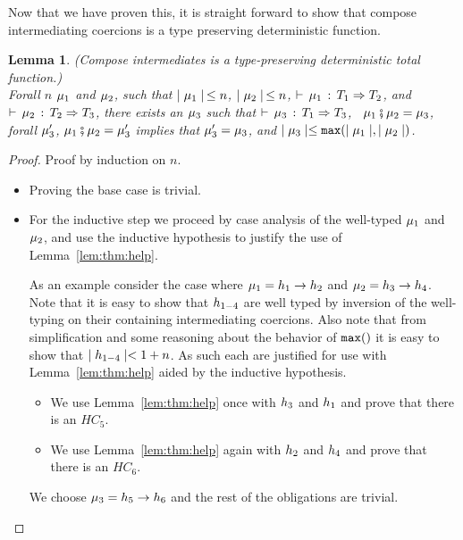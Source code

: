 \documentclass[acmtog, authorversion, acmlarge]{acmart}
\newtheorem{lem}{Lemma}
\begin{document}
Now that we have proven this, it is straight forward to show
that compose intermediating coercions is a type preserving
deterministic function. 

\begin{lem}
  \label{lem:composeIWDF}
  (Compose intermediates is a type-preserving deterministic total function.)\\
  Forall $n$ $\mu_1$ and $\mu_2$, such that
  $\mid \mu_1 \mid \, \le n$, \; $\mid \mu_2 \mid \, \le n$, \;
  $\vdash \, \mu_1 \, : \, T_1 \Rightarrow T_2$, and $\vdash \, \mu_2 \, : \, T_2 \Rightarrow T_3$,
  there exists an $\mu_3$ such that
  $\vdash \, \mu_3 \, : \, T_1 \Rightarrow T_3$, \,
  $\mu_1 \fatsemi \mu_2 = \mu_3$, \,
  forall $\mu_{3}^{\prime}$, \; $\mu_1 \fatsemi \mu_2 = \mu_{3}^{\prime}$
  implies that $\mu_{3}^{\prime} = \mu_{3}$,
  and $\mid \mu_3 \mid \le \texttt{max}(\mid \mu_1 \mid, \mid \mu_2 \mid)$.
\end{lem}
\begin{proof}
  Proof by induction on $n$. 
  \begin{itemize}
  \item Proving the base case is trivial.
  \item For the inductive step we proceed by case
    analysis of the well-typed $\mu_1$
    and $\mu_2$, and use the inductive hypothesis to
    justify the use of Lemma~\ref{lem:thm:help}. 

    As an example consider the case where
    $\mu_1 = h_1  \to  h_2$ and
    $\mu_2 = h_3  \to  h_4$.
    Note that it is easy to show that $h_{1-4}$ are well
    typed by inversion of the well-typing on their containing
    intermediating coercions.
    Also note that from simplification and some reasoning
    about the behavior of $\texttt{max}()$ it is easy to show that
    $\mid h_{1-4} \mid < 1 + n$.
    As such each are justified for use with Lemma~\ref{lem:thm:help}
    aided by the inductive hypothesis.
    \begin{itemize}
    \item We use Lemma~\ref{lem:thm:help} once with $h_3$ and $h_1$
      and prove that there is an $HC_5$.
    \item We use Lemma~\ref{lem:thm:help} again with $h_2$ and $h_4$
      and prove that there is an $HC_6$.
    \end{itemize}
    We choose $\mu_3 = h_5  \to  h_6$ and the rest of the
    obligations are trivial.
  \end{itemize} 
\end{proof}
\end{document}
